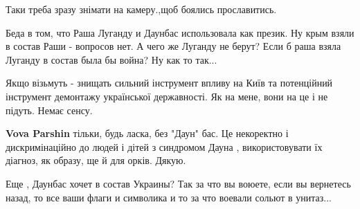 \begin{itemize}
 
Таки треба зразу знімати на камеру.,щоб боялись прославитись.

 

Беда в том, что Раша Луганду и Даунбас использовала как презик. Ну крым взяли в
состав Раши - вопросов нет. А чего же Луганду не берут? Если б раша взяла
Луганду в состав была бы война? Ну как то так...

\begin{itemize}
 
Якщо візьмуть - знищать сильний інструмент впливу на Київ та потенційний інструмент демонтажу української державності. Як на мене, вони на це і не підуть. Немає сенсу.

 
\textbf{Vova Parshin} тільки, будь ласка, без "Даун" бас. Це некоректно і дискримінаційно до людей і дітей з синдромом Дауна , використовувати їх діагноз, як образу, ще й для орків. Дякую.
\end{itemize}

 

Еще , Даунбас хочет в состав Украины? Так за что вы воюете, если вы вернетесь
назад, то все ваши флаги и символика и то за что воевали сольют в унитаз...


\end{itemize}
